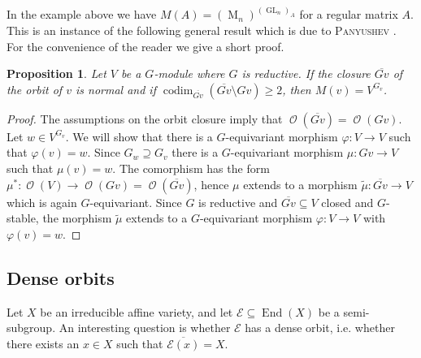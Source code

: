 \documentclass{amsart}
\newtheorem{prop}[thm]{Proposition}
\theoremstyle{definition}
\theoremstyle{remark}
\begin{document}
In the example above we have $M(A) = (\operatorname{M}_{n})^{({\operatorname{GL}_{n}})_{A}}$ for a regular matrix $A$. This is an instance of the following general result which is due to {\textsc{{Panyushev}\/}} \cite[Theorem~1]{Pa2002On-covariants-of-r}. For the convenience of the reader we give a short proof.

\begin{prop}\label{Panyushev.prop}
Let $V$ be a $G$-module where $G$ is reductive. If the closure $\overline{Gv}$ of the orbit of $v$ is normal and if 
$\operatorname{codim}_{\overline{Gv}}(\overline{Gv}\setminus Gv) \geq 2$, then $M(v) = V^{G_{v}}$.
\end{prop}

\begin{proof}
The assumptions on the orbit closure imply that $\operatorname{\mathcal O}(\overline{Gv}) = \operatorname{\mathcal O}(Gv)$. Let $w \in V^{G_{v}}$. 
We will show that there is a $G$-equivariant morphism ${\varphi}\colon V \to V$ such that ${\varphi}(v)=w$. Since $G_{w}\supseteq G_{v}$ there is a $G$-equivariant morphism $\mu\colon Gv \to V$ such that $\mu(v)=w$. The comorphism has the form $\mu^{*}\colon \operatorname{\mathcal O}(V) \to \operatorname{\mathcal O}(Gv) = \operatorname{\mathcal O}(\overline{Gv})$, hence $\mu$ extends to a morphism $\tilde\mu\colon \overline{Gv} \to V$ which is again $G$-equivariant. Since $G$ is reductive and $\overline{Gv}{\subseteq} V$ closed and $G$-stable, the morphism $\tilde\mu$ extends to a $G$-equivariant morphism ${\varphi}\colon V \to V$ with ${\varphi}(v)=w$.
\end{proof}

{\par\smallskip}
\subsection{Dense orbits}
Let $X$ be an irreducible affine variety, and let ${\mathcal E} {\subseteq} \operatorname{End}(X)$ be a semi-subgroup. An interesting question is whether ${\mathcal E}$ has a dense orbit, i.e. whether there exists an $x \in X$ such that $\overline{{\mathcal E}(x)}=X$. 
\end{document}
